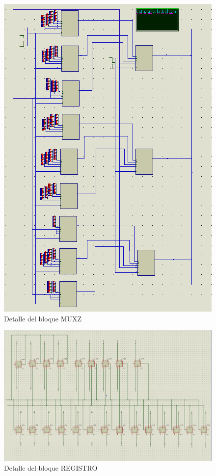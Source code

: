 \documentclass[12pt,a4paper,oneside]{article}
\begin{document}
\begin{figure}[H]
    \includegraphics[width = \textwidth]{proteus-img/muxzcontrol.PNG}
    \caption{Detalle del bloque MUXZ}
\end{figure}

\begin{figure}[H]
    \includegraphics[width = \textwidth]{proteus-img/registro.PNG}
    \caption{Detalle del bloque REGISTRO}
\end{figure}
\end{document}
